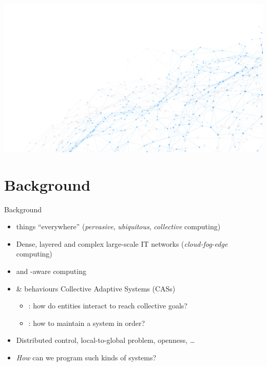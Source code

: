 \documentclass[8pt, aspectratio=169, handout]{beamer}
\begin{document}
\begin{frame}[plain]
  \begin{backgroundblock} 
    \includegraphics[width=\paperwidth]{img/network.jpg} 
  \end{backgroundblock} 
\titlepage
\end{frame}
\addtocounter{framenumber}{-1}
\section{Background}
\begin{frame}{Background}
  \begin{card}
    \begin{itemize}
      \item {} things ``everywhere'' (\emph{pervasive}, \emph{ubiquitous}, \emph{collective} computing)
      \item Dense, layered and complex large-scale IT networks (\emph{cloud-fog-edge} computing)
      \item {} and -aware computing
    \end{itemize}
  \end{card}
  \begin{alarm}[Challenges]
    \begin{itemize}
      \item {} \&  behaviours \emph{\faArrowRight} Collective Adaptive Systems (CASs)
      \begin{itemize}
        \item {}: how do entities interact to reach collective goals?
        \item {}: how to maintain a system in order?
      \end{itemize}
      \item Distributed control, local-to-global problem, openness, \dots
      \item \emph{How} can we program such kinds of systems?
    \end{itemize}
  \end{alarm}
\end{frame}
\end{document}
